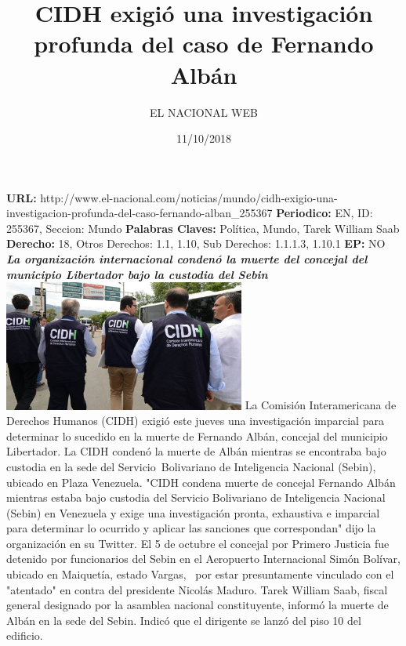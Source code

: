 \documentclass{article}%
\title{\textbf{CIDH exigió una investigación profunda del caso de Fernando Albán}}%
\author{EL NACIONAL WEB}%
\date{11/10/2018}%
\begin{document}
%
\normalsize%
\maketitle%
\textbf{URL: }%
http://www.el{-}nacional.com/noticias/mundo/cidh{-}exigio{-}una{-}investigacion{-}profunda{-}del{-}caso{-}fernando{-}alban\_255367\newline%
%
\textbf{Periodico: }%
EN, %
ID: %
255367, %
Seccion: %
Mundo\newline%
%
\textbf{Palabras Claves: }%
Política, Mundo, Tarek William Saab\newline%
%
\textbf{Derecho: }%
18, %
Otros Derechos: %
1.1, 1.10, %
Sub Derechos: %
1.1.1.3, 1.10.1\newline%
%
\textbf{EP: }%
NO\newline%
\newline%
%
\textbf{\textit{La organización internacional condenó la muerte del concejal del municipio Libertador bajo la custodia del Sebin}}%
\newline%
\newline%
%
\includegraphics[width=300px]{213.jpg}%
\newline%
%
La Comisión Interamericana de Derechos Humanos (CIDH) exigió este jueves una investigación imparcial para determinar lo sucedido en la muerte de Fernando Albán, concejal del municipio Libertador.%
\newline%
%
La CIDH condenó la muerte de Albán mientras se encontraba bajo custodia en la sede del Servicio~Bolivariano de Inteligencia Nacional (Sebin), ubicado en Plaza Venezuela.%
\newline%
%
"CIDH condena muerte de concejal Fernando Albán mientras estaba bajo custodia del Servicio Bolivariano de Inteligencia Nacional (Sebin) en Venezuela y exige una investigación pronta, exhaustiva e imparcial para determinar lo ocurrido y aplicar las sanciones que correspondan" dijo la organización en su Twitter.%
\newline%
%
El 5 de octubre el concejal por Primero Justicia fue detenido por funcionarios del Sebin en el Aeropuerto Internacional Simón Bolívar, ubicado en Maiquetía, estado Vargas,~ por estar presuntamente vinculado con el "atentado" en contra del presidente Nicolás Maduro.%
\newline%
%
Tarek William Saab, fiscal general designado por la asamblea nacional constituyente, informó la muerte de Albán en la sede del Sebin. Indicó que el dirigente se lanzó del piso 10 del edificio.%
\newline%
%
\end{document}
